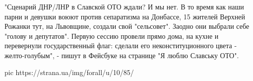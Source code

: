 "Сценарий ДНР/ЛНР в Славской ОТО ждали? И мы нет. В то время как наши
парни и девушки воюют против сепаратизма на Донбассе, 15 жителей Верхней
Рожанки тут, на Львовщине, создали свой "сельсовет". Заодно они выбрали
себе "голову и депутатов". Первую сессию провели прямо дома, на кухне и
перевернули государственный флаг: сделали  его неконституционного цвета -
желто-голубым", - пишут в Фейсбуке на странице "Я люблю Славську ОТО". 

\ifcmt
pic https://strana.ua/img/forall/u/10/85/%
\fi


